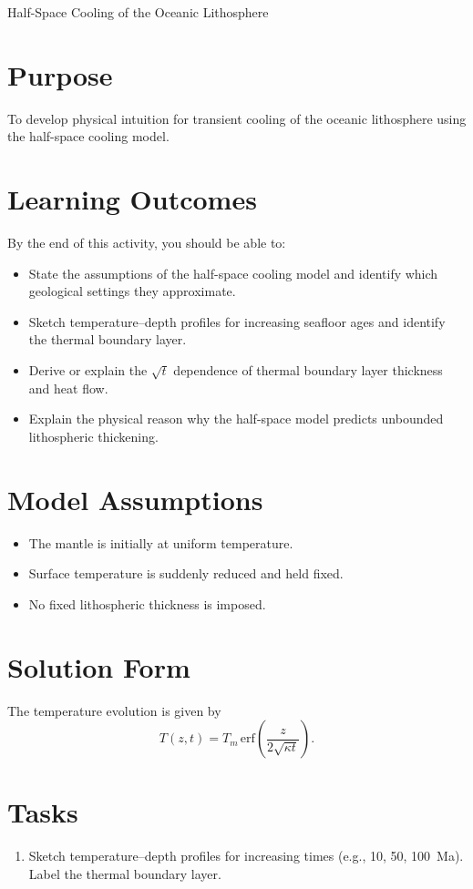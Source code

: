 \begin{activity}{Half-Space Cooling of the Oceanic Lithosphere}

\section*{Purpose}
To develop physical intuition for transient cooling of the oceanic lithosphere
using the half-space cooling model.

{\color{red}
\section*{Learning Outcomes}

By the end of this activity, you should be able to:
\begin{itemize}
  \item State the assumptions of the half-space cooling model and identify which geological settings they approximate.
  \item Sketch temperature--depth profiles for increasing seafloor ages and identify the thermal boundary layer.
  \item Derive or explain the $\sqrt{t}$ dependence of thermal boundary layer thickness and heat flow.
  \item Explain the physical reason why the half-space model predicts unbounded lithospheric thickening.
\end{itemize}
}

\section*{Model Assumptions}
\begin{itemize}
  \item The mantle is initially at uniform temperature.
  \item Surface temperature is suddenly reduced and held fixed.
  \item No fixed lithospheric thickness is imposed.
\end{itemize}

\section*{Solution Form}
The temperature evolution is given by
\[
T(z,t) = T_m \,\mathrm{erf}\!\left(
\frac{z}{2\sqrt{\kappa t}}
\right).
\]

\section*{Tasks}
\begin{enumerate}
  \item Sketch temperature--depth profiles for increasing times (e.g., 10, 50, 100~Ma). Label the thermal boundary layer.
  \answerbox[6cm]


\end{enumerate}
\end{activity}
